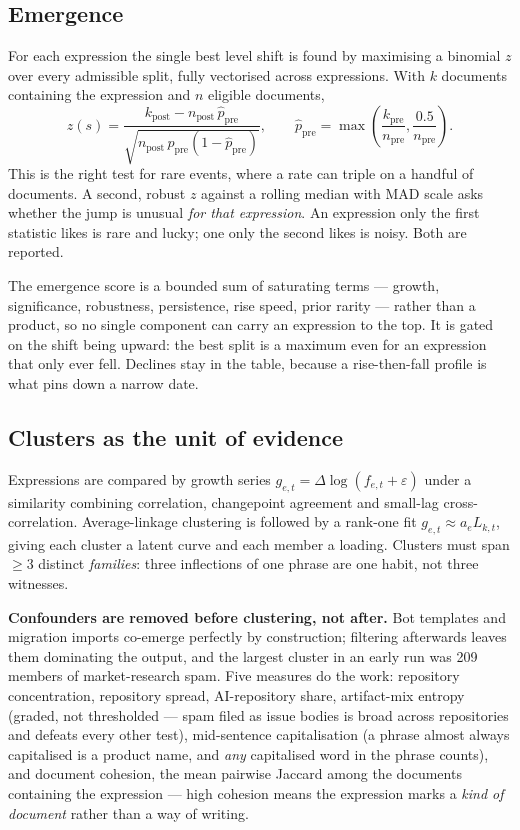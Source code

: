\documentclass[11pt,a4paper]{article}
\begin{document}
\subsection{Emergence}

For each expression the single best level shift is found by maximising a binomial $z$
over every admissible split, fully vectorised across expressions. With $k$ documents
containing the expression and $n$ eligible documents,
\[
z(s)=\frac{k_{\text{post}} - n_{\text{post}}\,\hat p_{\text{pre}}}
{\sqrt{n_{\text{post}}\,\hat p_{\text{pre}}(1-\hat p_{\text{pre}})}},
\qquad
\hat p_{\text{pre}}=\max\!\left(\frac{k_{\text{pre}}}{n_{\text{pre}}},\frac{0.5}{n_{\text{pre}}}\right).
\]
This is the right test for rare events, where a rate can triple on a handful of
documents. A second, robust $z$ against a rolling median with MAD scale asks whether
the jump is unusual \emph{for that expression}. An expression only the first statistic
likes is rare and lucky; one only the second likes is noisy. Both are reported.

The emergence score is a bounded sum of saturating terms --- growth, significance,
robustness, persistence, rise speed, prior rarity --- rather than a product, so no
single component can carry an expression to the top. It is gated on the shift being
upward: the best split is a maximum even for an expression that only ever fell.
Declines stay in the table, because a rise-then-fall profile is what pins down a
narrow date.

\subsection{Clusters as the unit of evidence}

Expressions are compared by growth series $g_{e,t}=\Delta\log(f_{e,t}+\varepsilon)$
under a similarity combining correlation, changepoint agreement and small-lag
cross-correlation. Average-linkage clustering is followed by a rank-one fit
$g_{e,t}\approx a_e L_{k,t}$, giving each cluster a latent curve and each member a
loading. Clusters must span $\geq 3$ distinct \emph{families}: three inflections of one
phrase are one habit, not three witnesses.

\textbf{Confounders are removed before clustering, not after.} Bot templates and
migration imports co-emerge perfectly by construction; filtering afterwards leaves
them dominating the output, and the largest cluster in an early run was 209 members of
market-research spam. Five measures do the work: repository concentration, repository
spread, AI-repository share, artifact-mix entropy (graded, not thresholded --- spam
filed as issue bodies is broad across repositories and defeats every other test),
mid-sentence capitalisation (a phrase almost always capitalised is a product name, and
\emph{any} capitalised word in the phrase counts), and document cohesion, the mean
pairwise Jaccard among the documents containing the expression --- high cohesion means
the expression marks a \emph{kind of document} rather than a way of writing.
\end{document}
